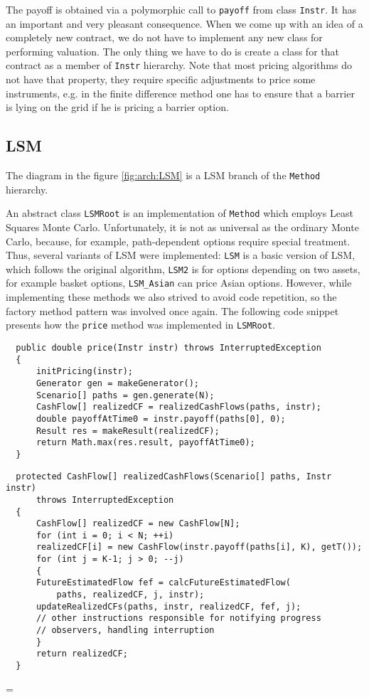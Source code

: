 \documentclass[a4paper,11pt, twoside]{book}
\newenvironment{absolutelynopagebreak}
  {\par\nobreak\vfill\penalty0\vfilneg
   \vtop\bgroup}
  {\par\xdef\tpd{\the\prevdepth}\egroup
   \prevdepth=\tpd}
\theoremstyle{definition}
\theoremstyle{remark}
\newcounter{example}[chapter]
\begin{document}
The payoff is obtained via a polymorphic call to \texttt{payoff} from class \texttt{Instr}. It has an important and very pleasant consequence. When we come up with an idea of a completely new contract, we do not have to implement any new class for performing valuation. The only thing we have to do is create a class for that contract as a member of \texttt{Instr} hierarchy. Note that most pricing algorithms do not have that property, they require specific adjustments to price some instruments, e.g. in the finite difference method one has to ensure that a barrier is lying on the grid if he is pricing a barrier option.
   

\subsection{LSM}
The diagram in the figure \ref{fig:arch:LSM} is a LSM branch of the \texttt{Method} hierarchy.

An abstract class \texttt{LSMRoot} is an implementation of \texttt{Method} which employs Least Squares Monte Carlo. Unfortunately,  it is not as universal as the ordinary Monte Carlo, because, for example, path-dependent options require  special treatment. Thus, several variants of LSM were implemented: \texttt{LSM} is a basic version of LSM, which follows the original algorithm, \texttt{LSM2} is for options depending on two assets, for example basket options, \texttt{LSM\_Asian} can price Asian options.
However, while implementing these methods we also strived to avoid code repetition, so the factory method pattern was involved once again. The following code snippet presents how the \texttt{price} method was implemented in \texttt{LSMRoot}.

\begin{lstlisting}
  public double price(Instr instr) throws InterruptedException
  {       
      initPricing(instr);
      Generator gen = makeGenerator();
      Scenario[] paths = gen.generate(N);
      CashFlow[] realizedCF = realizedCashFlows(paths, instr);
      double payoffAtTime0 = instr.payoff(paths[0], 0);
      Result res = makeResult(realizedCF);
      return Math.max(res.result, payoffAtTime0);
  }
\end{lstlisting} 
\begin{absolutelynopagebreak}
\begin{lstlisting}
  protected CashFlow[] realizedCashFlows(Scenario[] paths, Instr instr)
	  throws InterruptedException
  {
      CashFlow[] realizedCF = new CashFlow[N];
      for (int i = 0; i < N; ++i)
	  realizedCF[i] = new CashFlow(instr.payoff(paths[i], K), getT());
      for (int j = K-1; j > 0; --j)
      {
	  FutureEstimatedFlow fef = calcFutureEstimatedFlow(
	      paths, realizedCF, j, instr);
	  updateRealizedCFs(paths, instr, realizedCF, fef, j);
	  // other instructions responsible for notifying progress
	  // observers, handling interruption
      }       
      return realizedCF;
  }
\end{lstlisting} 
\end{absolutelynopagebreak}
\end{document}
